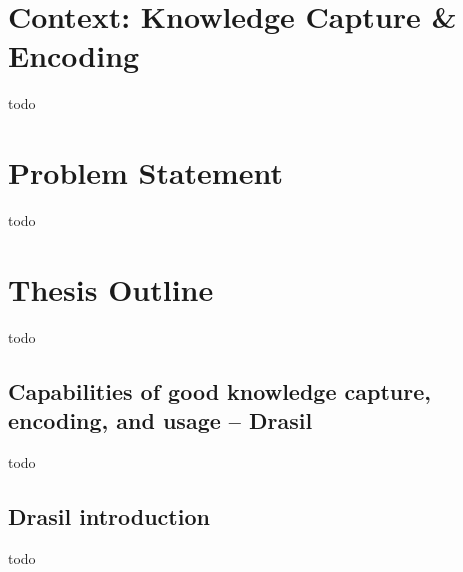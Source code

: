 \section{Context: Knowledge Capture \& Encoding}
todo

\section{Problem Statement}
todo

\section{Thesis Outline}
todo

\subsection{Capabilities of good knowledge capture, encoding, and usage -- Drasil}
todo

\subsection{Drasil introduction}
todo
